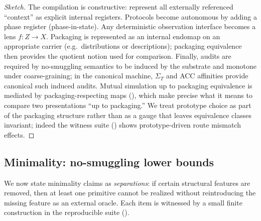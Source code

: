 \documentclass[11pt]{article}
\theoremstyle{definition}
\theoremstyle{remark}
\begin{document}
\begin{proof}[Sketch]
The compilation is constructive: represent all externally referenced ``context'' as explicit internal registers.
Protocols become autonomous by adding a phase register (phase-in-state).
Any deterministic observation interface becomes a lens $f:Z\to X$.
Packaging is represented as an internal endomap on an appropriate carrier (e.g.\ distributions or descriptions); packaging equivalence then provides the quotient notion used for comparison.
Finally, audits are required by no-smuggling semantics to be induced by the substrate and monotone under coarse-graining; in the canonical machine, $\Sigma_T$ and ACC affinities provide canonical such induced audits.
Mutual simulation up to packaging equivalence is mediated by packaging-respecting maps (), which make precise what it means to compare two presentations ``up to packaging.''
We treat prototype choice as part of the packaging structure rather than as a gauge that leaves equivalence classes invariant; indeed the witness suite () shows prototype-driven route mismatch effects.
\end{proof}

\subsection{Minimality: no-smuggling lower bounds}

We now state minimality claims as \emph{separations}: if certain structural features are removed, then at least one primitive cannot be realized without reintroducing the missing feature as an external oracle.
Each item is witnessed by a small finite construction in the reproducible suite ().
\end{document}
